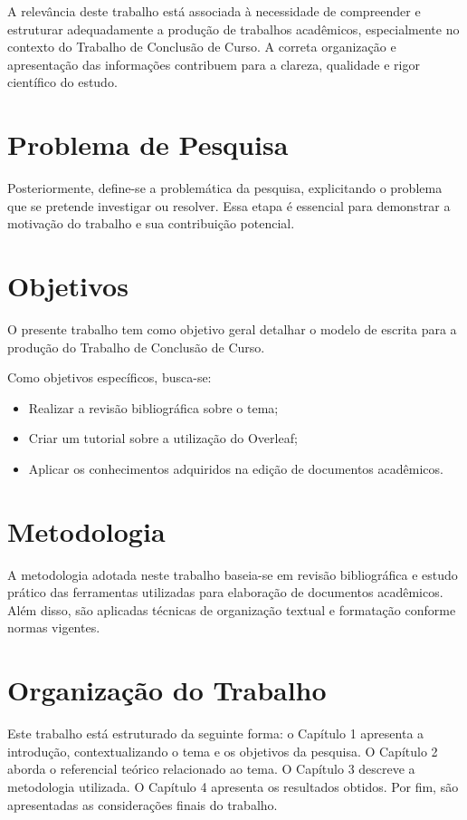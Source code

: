 A relevância deste trabalho está associada à necessidade de compreender e estruturar adequadamente a produção de trabalhos acadêmicos, especialmente no contexto do Trabalho de Conclusão de Curso. A correta organização e apresentação das informações contribuem para a clareza, qualidade e rigor científico do estudo.

\section{Problema de Pesquisa}

Posteriormente, define-se a problemática da pesquisa, explicitando o problema que se pretende investigar ou resolver. Essa etapa é essencial para demonstrar a motivação do trabalho e sua contribuição potencial.

\section{Objetivos}

O presente trabalho tem como objetivo geral detalhar o modelo de escrita para a produção do Trabalho de Conclusão de Curso.

Como objetivos específicos, busca-se:

\begin{itemize}
    \item Realizar a revisão bibliográfica sobre o tema;
    \item Criar um tutorial sobre a utilização do Overleaf;
    \item Aplicar os conhecimentos adquiridos na edição de documentos acadêmicos.
\end{itemize}

\section{Metodologia}

A metodologia adotada neste trabalho baseia-se em revisão bibliográfica e estudo prático das ferramentas utilizadas para elaboração de documentos acadêmicos. Além disso, são aplicadas técnicas de organização textual e formatação conforme normas vigentes.

\section{Organização do Trabalho}

Este trabalho está estruturado da seguinte forma: o Capítulo 1 apresenta a introdução, contextualizando o tema e os objetivos da pesquisa. O Capítulo 2 aborda o referencial teórico relacionado ao tema. O Capítulo 3 descreve a metodologia utilizada. O Capítulo 4 apresenta os resultados obtidos. Por fim, são apresentadas as considerações finais do trabalho.
